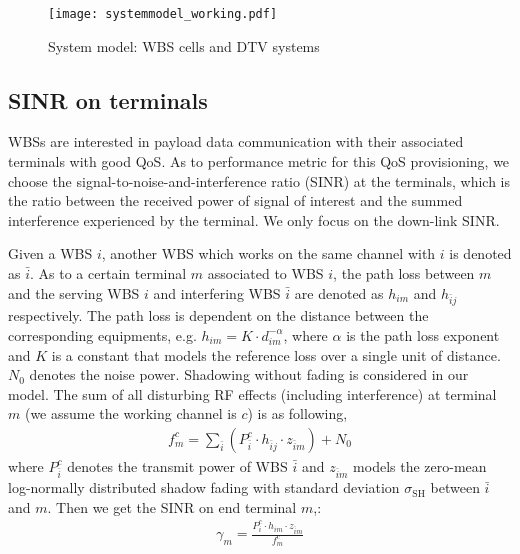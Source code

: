 \begin{figure}[h!]
  \centering
  \texttt{[image: systemmodel\_working.pdf]}
  \caption{System model: WBS cells and DTV systems}
\label{sysmodel}
\end{figure}

\subsection{SINR on terminals}
WBSs are interested in payload data communication with their associated terminals with good \gls{QoS}. 
As to performance metric for this QoS provisioning, we choose the signal-to-noise-and-interference ratio (\gls{SINR}) at the terminals, which is the ratio between the received power of signal of interest and the summed interference experienced by the terminal. 
We only focus on the down-link SINR. 

Given a WBS $i$, another WBS which works on the same channel with $i$ is denoted as $\bar{i}$.
As to a certain terminal $m$ associated to WBS $i$, the path loss between $m$ and the serving WBS $i$ and interfering WBS $\bar{i}$ are denoted as $h_{im}$ and $h_{\bar{i}j}$ respectively.
The path loss is dependent on the distance between the corresponding equipments, e.g. $h_{im}=K \cdot d_{im}^{-\alpha}$, where $\alpha$ is the path loss exponent and $K$ is a constant that models the reference loss over a single unit of distance.  
$N_0$ denotes the noise power.
Shadowing without fading is considered in our model.
The sum of all disturbing RF effects (including interference) at terminal $m$ (we assume the working channel is $c$) is as following,
\begin{equation}
\label{interference}
\begin{aligned}
f_m^c=\sum_{\bar{i}} (P_{\bar{i}}^c \cdot h_{\bar{i}j} \cdot z_{\bar{i}m}) +  N_0
\end{aligned}
\end{equation}
where $P_{\bar{i}}^c$ denotes the transmit power of WBS $\bar{i}$ and $z_{\bar{i}m}$ models the zero-mean log-normally distributed shadow fading with standard deviation $\sigma_{\text{SH}}$ between $\bar{i}$ and $m$.
Then we get the \gls{SINR} on end terminal $m$,:
\begin{equation}
\label{SINR}
\begin{aligned}
\gamma_{m} = \frac{P_{i}^c \cdot h_{im}\cdot z_{\bar{i}m}} {f_m^c}
\end{aligned}
\end{equation}



